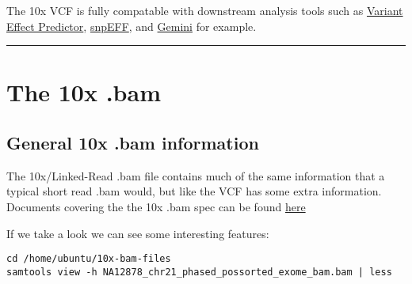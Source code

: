 \documentclass[]{article}
\begin{document}
The 10x VCF is fully compatable with downstream analysis tools such as
\href{https://uswest.ensembl.org/info/docs/tools/vep/index.html}{Variant
Effect Predictor}, \href{http://snpeff.sourceforge.net/}{snpEFF}, and
\href{http://gemini.readthedocs.io/en/latest/index.html}{Gemini} for
example.

\begin{center}\rule{0.5\linewidth}{\linethickness}\end{center}

\section{\texorpdfstring{\textbf{The 10x
.bam}}{The 10x .bam}}\label{the-10x-.bam}

\subsection{General 10x .bam
information}\label{general-10x-.bam-information}

The 10x/Linked-Read .bam file contains much of the same information that
a typical short read .bam would, but like the VCF has some extra
information. Documents covering the the 10x .bam spec can be found
\href{https://support.10xgenomics.com/genome-exome/software/pipelines/latest/output/bam}{here}

If we take a look we can see some interesting features:

\begin{verbatim}
cd /home/ubuntu/10x-bam-files
samtools view -h NA12878_chr21_phased_possorted_exome_bam.bam | less
\end{verbatim}
\end{document}
